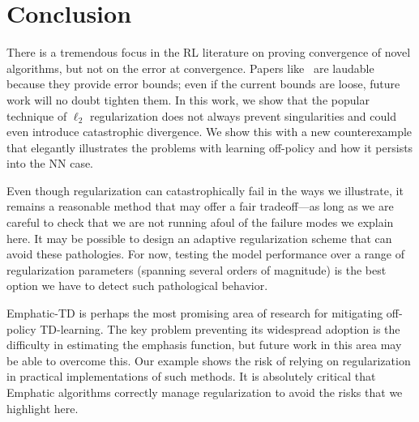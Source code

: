 \section{Conclusion}

There is a tremendous focus in the RL literature on proving convergence of novel algorithms, but not on the error at convergence. Papers like~\cite{zhang2021breaking} are laudable because they provide error bounds; even if the current bounds are loose, future work will no doubt tighten them.
In this work, we show that the popular technique of $\ell_2$ regularization does not always prevent singularities and could even introduce catastrophic divergence. We show this with a new counterexample that elegantly illustrates the problems with learning off-policy and how it persists into the NN case.

Even though regularization can catastrophically fail in the ways we illustrate, it remains a reasonable method that may offer a fair tradeoff---as long as we are careful to check that we are not running afoul of the failure modes we explain here. It may be possible to design an adaptive regularization scheme that can avoid these pathologies. For now, testing the model performance over a range of regularization parameters (spanning several orders of magnitude) is the best option we have to detect such pathological behavior.

Emphatic-TD is perhaps the most promising area of research for mitigating off-policy TD-learning. The key problem preventing its widespread adoption is the difficulty in estimating the emphasis function, but future work in this area may be able to overcome this. Our example shows the risk of relying on regularization in practical implementations of such methods. It is absolutely critical that Emphatic algorithms correctly manage regularization to avoid the risks that we highlight here.

% 
